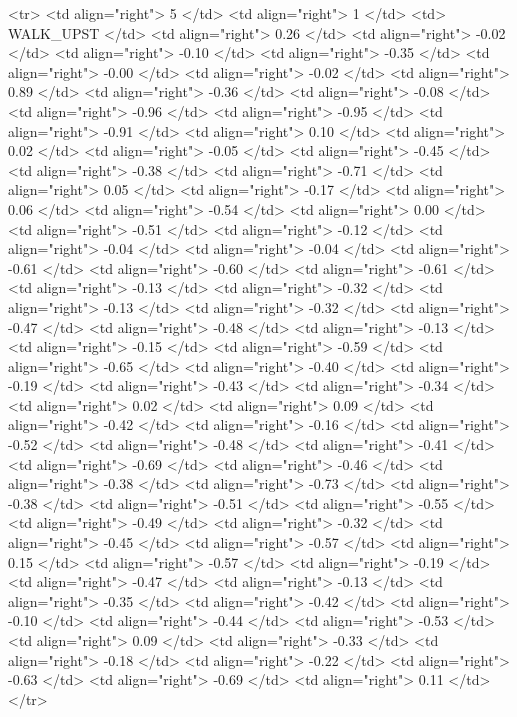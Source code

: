   <tr> <td align="right"> 5 </td> <td align="right">   1 </td> <td> WALK_UPST </td> <td align="right"> 0.26 </td> <td align="right"> -0.02 </td> <td align="right"> -0.10 </td> <td align="right"> -0.35 </td> <td align="right"> -0.00 </td> <td align="right"> -0.02 </td> <td align="right"> 0.89 </td> <td align="right"> -0.36 </td> <td align="right"> -0.08 </td> <td align="right"> -0.96 </td> <td align="right"> -0.95 </td> <td align="right"> -0.91 </td> <td align="right"> 0.10 </td> <td align="right"> 0.02 </td> <td align="right"> -0.05 </td> <td align="right"> -0.45 </td> <td align="right"> -0.38 </td> <td align="right"> -0.71 </td> <td align="right"> 0.05 </td> <td align="right"> -0.17 </td> <td align="right"> 0.06 </td> <td align="right"> -0.54 </td> <td align="right"> 0.00 </td> <td align="right"> -0.51 </td> <td align="right"> -0.12 </td> <td align="right"> -0.04 </td> <td align="right"> -0.04 </td> <td align="right"> -0.61 </td> <td align="right"> -0.60 </td> <td align="right"> -0.61 </td> <td align="right"> -0.13 </td> <td align="right"> -0.32 </td> <td align="right"> -0.13 </td> <td align="right"> -0.32 </td> <td align="right"> -0.47 </td> <td align="right"> -0.48 </td> <td align="right"> -0.13 </td> <td align="right"> -0.15 </td> <td align="right"> -0.59 </td> <td align="right"> -0.65 </td> <td align="right"> -0.40 </td> <td align="right"> -0.19 </td> <td align="right"> -0.43 </td> <td align="right"> -0.34 </td> <td align="right"> 0.02 </td> <td align="right"> 0.09 </td> <td align="right"> -0.42 </td> <td align="right"> -0.16 </td> <td align="right"> -0.52 </td> <td align="right"> -0.48 </td> <td align="right"> -0.41 </td> <td align="right"> -0.69 </td> <td align="right"> -0.46 </td> <td align="right"> -0.38 </td> <td align="right"> -0.73 </td> <td align="right"> -0.38 </td> <td align="right"> -0.51 </td> <td align="right"> -0.55 </td> <td align="right"> -0.49 </td> <td align="right"> -0.32 </td> <td align="right"> -0.45 </td> <td align="right"> -0.57 </td> <td align="right"> 0.15 </td> <td align="right"> -0.57 </td> <td align="right"> -0.19 </td> <td align="right"> -0.47 </td> <td align="right"> -0.13 </td> <td align="right"> -0.35 </td> <td align="right"> -0.42 </td> <td align="right"> -0.10 </td> <td align="right"> -0.44 </td> <td align="right"> -0.53 </td> <td align="right"> 0.09 </td> <td align="right"> -0.33 </td> <td align="right"> -0.18 </td> <td align="right"> -0.22 </td> <td align="right"> -0.63 </td> <td align="right"> -0.69 </td> <td align="right"> 0.11 </td> </tr>
